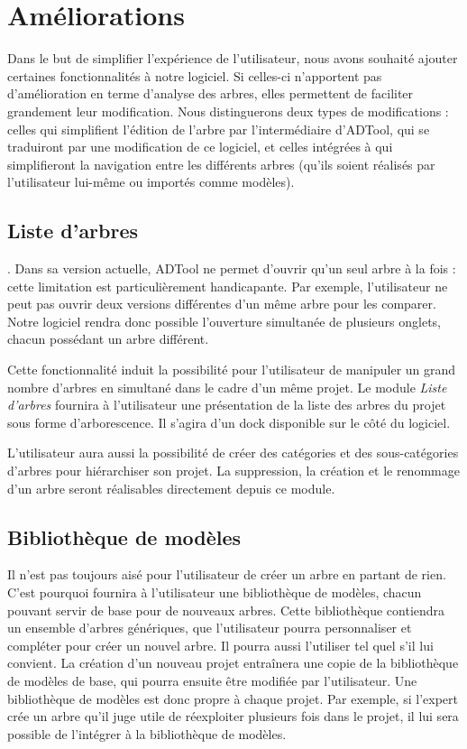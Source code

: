 \section{Améliorations}


	Dans le but de simplifier l'expérience de l'utilisateur, nous avons souhaité ajouter %
	certaines fonctionnalités à notre logiciel. Si celles-ci n'apportent pas d'amélioration en terme d'analyse des arbres, elles permettent de faciliter grandement leur modification. Nous distinguerons deux types de modifications : celles qui simplifient l'édition de l'arbre par l’intermédiaire d'ADTool, qui se traduiront par une modification de ce logiciel, et celles intégrées à \glasir qui simplifieront la navigation entre les différents arbres (qu'ils soient réalisés par l'utilisateur lui-même ou importés comme modèles). 

	\subsection{Liste d'arbres}.
		Dans sa version actuelle, ADTool ne permet d'ouvrir qu'un seul arbre à la fois : cette limitation est particulièrement handicapante. Par exemple, l'utilisateur ne peut pas ouvrir deux versions différentes d'un même arbre pour les comparer. Notre logiciel rendra donc possible l'ouverture simultanée de plusieurs onglets, chacun possédant un arbre différent. 

		Cette fonctionnalité induit la possibilité pour l'utilisateur de manipuler un grand nombre d'arbres en simultané dans le cadre d'un même projet. Le module \emph{Liste d'arbres} fournira à l'utilisateur une présentation de la liste des arbres du projet sous forme d'arborescence. Il s'agira d'un dock disponible sur le côté du logiciel. 

		L'utilisateur aura aussi la possibilité de créer des catégories et des sous-catégories d'arbres pour hiérarchiser son projet. La suppression, la création et le renommage d'un arbre seront réalisables directement depuis ce module. %
	
	\subsection{Bibliothèque de modèles}
		Il n'est pas toujours aisé pour l'utilisateur de créer un arbre en partant de rien. C'est pourquoi \glasir fournira à l'utilisateur une bibliothèque de modèles, chacun pouvant servir de base pour de nouveaux arbres. Cette bibliothèque contiendra un ensemble d'arbres génériques, que l'utilisateur pourra personnaliser et compléter pour créer un nouvel arbre. Il pourra aussi l'utiliser tel quel s'il lui convient. La création d'un nouveau projet entraînera une copie de la bibliothèque de modèles de base, qui pourra ensuite être modifiée par l'utilisateur. Une bibliothèque de modèles est donc propre à chaque projet. Par exemple, si l'expert crée un arbre qu'il juge utile de réexploiter plusieurs fois dans le projet, il lui sera possible de l'intégrer à la bibliothèque de modèles.

